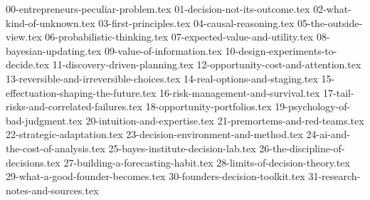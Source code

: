 
{00-entrepreneurs-peculiar-problem.tex}
{01-decision-not-its-outcome.tex}
{02-what-kind-of-unknown.tex}
{03-first-principles.tex}
{04-causal-reasoning.tex}
{05-the-outside-view.tex}
{06-probabilistic-thinking.tex}
{07-expected-value-and-utility.tex}
{08-bayesian-updating.tex}
{09-value-of-information.tex}
{10-design-experiments-to-decide.tex}
{11-discovery-driven-planning.tex}
{12-opportunity-cost-and-attention.tex}
{13-reversible-and-irreversible-choices.tex}
{14-real-options-and-staging.tex}
{15-effectuation-shaping-the-future.tex}
{16-risk-management-and-survival.tex}
{17-tail-risks-and-correlated-failures.tex}
{18-opportunity-portfolios.tex}
{19-psychology-of-bad-judgment.tex}
{20-intuition-and-expertise.tex}
{21-premortems-and-red-teams.tex}
{22-strategic-adaptation.tex}
{23-decision-environment-and-method.tex}
{24-ai-and-the-cost-of-analysis.tex}
{25-bayes-institute-decision-lab.tex}
{26-the-discipline-of-decisions.tex}
{27-building-a-forecasting-habit.tex}
{28-limits-of-decision-theory.tex}
{29-what-a-good-founder-becomes.tex}
{30-founders-decision-toolkit.tex}
{31-research-notes-and-sources.tex}
